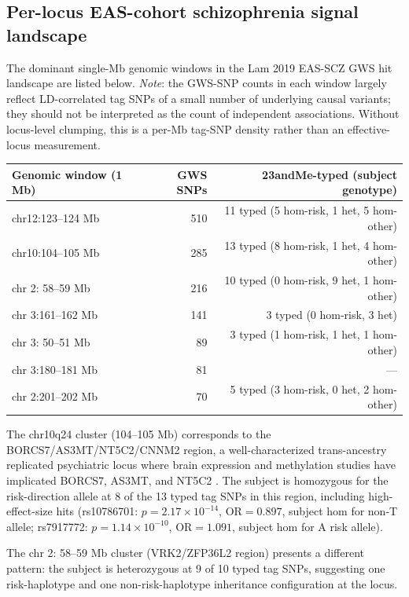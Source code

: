 \documentclass[11pt,a4paper]{article}
\begin{document}
\subsection{Per-locus EAS-cohort schizophrenia signal landscape}

The dominant single-Mb genomic windows in the Lam 2019 EAS-SCZ GWS hit landscape are listed below. \emph{Note}: the GWS-SNP counts in each window largely reflect LD-correlated tag SNPs of a small number of underlying causal variants; they should not be interpreted as the count of independent associations. Without locus-level clumping, this is a per-Mb tag-SNP density rather than an effective-locus measurement.

\begin{center}
\begin{tabular}{lrr}
\toprule
Genomic window (1 Mb) & GWS SNPs & 23andMe-typed (subject genotype) \\
\midrule
chr12:123--124 Mb & 510 & 11 typed (5 hom-risk, 1 het, 5 hom-other) \\
chr10:104--105 Mb & 285 & 13 typed (8 hom-risk, 1 het, 4 hom-other) \\
chr 2: 58--59 Mb  & 216 & 10 typed (0 hom-risk, 9 het, 1 hom-other) \\
chr 3:161--162 Mb & 141 & 3 typed (0 hom-risk, 3 het) \\
chr 3: 50--51 Mb  &  89 & 3 typed (1 hom-risk, 1 het, 1 hom-other) \\
chr 3:180--181 Mb &  81 & --- \\
chr 2:201--202 Mb &  70 & 5 typed (3 hom-risk, 0 het, 2 hom-other) \\
\bottomrule
\end{tabular}
\end{center}

The chr10q24 cluster (104--105 Mb) corresponds to the BORCS7/AS3MT/NT5C2/CNNM2 region, a well-characterized trans-ancestry replicated psychiatric locus where brain expression and methylation studies have implicated BORCS7, AS3MT, and NT5C2 \cite{li2016,duarte2016}. The subject is homozygous for the risk-direction allele at 8 of the 13 typed tag SNPs in this region, including high-effect-size hits (rs10786701: $p = 2.17 \times 10^{-14}$, $\text{OR} = 0.897$, subject hom for non-T allele; rs7917772: $p = 1.14 \times 10^{-10}$, $\text{OR} = 1.091$, subject hom for A risk allele).

The chr 2: 58--59 Mb cluster (VRK2/ZFP36L2 region) presents a different pattern: the subject is heterozygous at 9 of 10 typed tag SNPs, suggesting one risk-haplotype and one non-risk-haplotype inheritance configuration at the locus.
\end{document}
